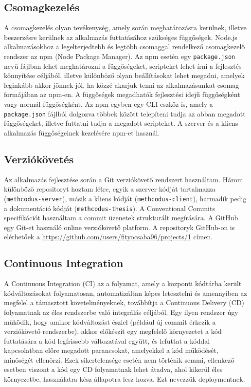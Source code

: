 \documentclass{elteikthesis}
\begin{document}
			\subsection{Csomagkezelés}
				A csomagkezelés olyan tevékenység, amely során meghatározásra kerülnek, illetve beszerzésre kerülnek az alkalmazás futtatásához szükséges függőségek. Node.js alkalmazásokhoz a legelterjedtebb és legtöbb csomaggal rendelkező csomagkezelő rendszer az npm (Node Package Manager). Az npm esetén egy \texttt{package.json} nevű fájlban lehet meghatározni a függőségeket, scripteket lehet írni a fejlesztés könnyítése céljából, illetve különböző olyan beállításokat lehet megadni, amelyek leginkább akkor jönnek jól, ha közzé akarjuk tenni az alkalmazásunkat csomag formájában az npm-en. A függőségek megadhatók fejlesztési idejű függőségként vagy normál függőségként. Az npm egyben egy CLI eszköz is, amely a \texttt{package.json} fájlból dolgozva többek között telepíteni tudja az abban megadott függőségeket, illetve futtatni tudja a megadott scripteket. A szerver és a kliens alkalmazás függőségeinek kezelésére npm-et használ.
			
			\subsection{Verziókövetés}
				Az alkalmazás fejlesztése során a Git verziókövető rendszert használtam. Három különböző repositoryt hoztam létre, egyik a szerver kódját tartalmazza (\texttt{methcodus-server}), másik a kliens kódját (\texttt{methcodus-client}), harmadik pedig a dokumentáció kódját (\texttt{methcodus-thesis}). A Conventional Commits specifikációt használtam a commit üzenetek strukturált megírására. A GitHub egy Git-et használó online verziókövető platform. A repositoryk GitHub-on is elérhetőek a \url{https://github.com/users/fityocsaba96/projects/1} címen.
			
			\subsection{Continuous Integration}
				A Continuous Integration (CI) az a folyamat, amely a központi kódtárba került kódváltozásokat folyamatosan, automatizáltan képes letesztelni és amennyiben az megfelel a támasztott követelményeknek, továbbítja a Continuous Delivery (CD) folyamatnak az éles rendszerbe való integrálás céljából. Egy ilyen rendszer úgy működik, hogy amikor kódváltozást észlel (például új commit érkezik a verziókövető rendszerbe), akkor előkészít egy megfelelő környezetet a kód futtatására a kód legfrissebb változatával együtt, és lefuttat a kóddal kapcsolatban előre megadott parancsokat, amelyekkel a kód működését, minőségét ellenőrzi. Ezek sikertelensége esetén nem történik semmi, ellenkező esetben viszont a kód egy CD folyamatnak lehet átadva, ahol kikerül éles környezetbe, használatra kész állapotra lesz hozva. Ezt nevezzük deploymentnek.
\end{document}
